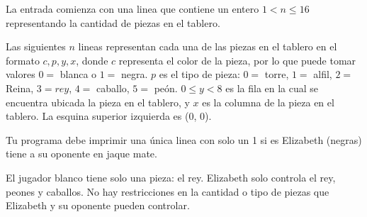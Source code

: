 \documentclass{oci}
\begin{document}
\begin{inputDescription}
    La entrada comienza con una linea que contiene un entero $ 1 < n
    \leq 16$ representando la cantidad de piezas en el tablero.

    Las siguientes $n$ lineas representan cada una de las piezas en el
    tablero en el formato $c, p, y, x$, donde $c$ representa el color
    de la pieza, por lo que puede tomar valores $0 = $ blanca o $1
    = $ negra. $p$ es el tipo de pieza: $0 =$ torre, $1 = $ alfil, $2
    = $ Reina, $3 = rey$, $4 = $ caballo, $5 = $ peón. $0 \leq y < 8$ es la fila en
    la cual se encuentra ubicada la pieza en el tablero, y $x$ es la
    columna de la pieza en el tablero. La esquina superior izquierda
    es (0, 0).
\end{inputDescription}

\begin{outputDescription}
    Tu programa debe imprimir una única linea con solo un 1 si es
    Elizabeth (negras) tiene a su oponente en jaque mate.
\end{outputDescription}

\begin{scoreDescription}
  El jugador blanco tiene solo una pieza: el rey.
  Elizabeth solo controla el rey, peones y caballos.
  No hay restricciones en la cantidad o tipo de piezas que Elizabeth y
  su oponente pueden controlar.
\end{scoreDescription}

\begin{sampleDescription}
\end{sampleDescription}
\end{document}
